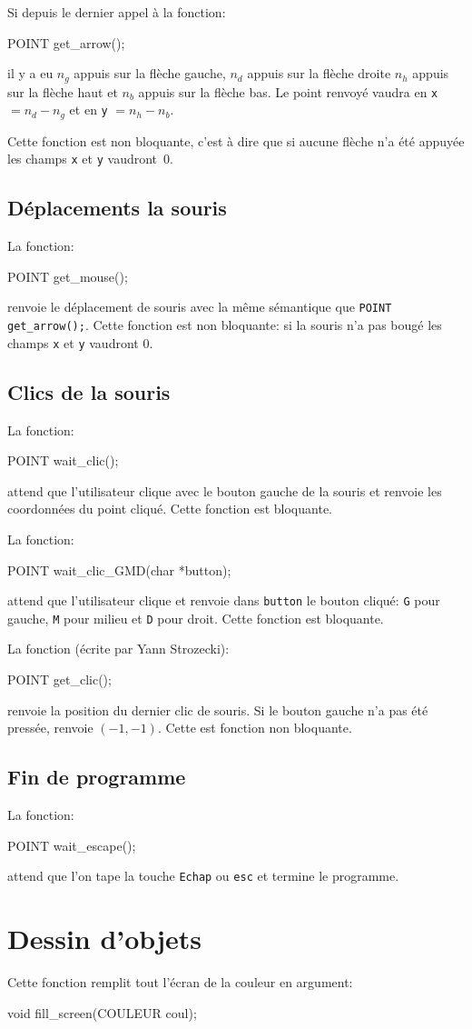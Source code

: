 \documentclass{article}
\newcommand\code[1]{
\begin{mdframed}[linecolor=purple,backgroundcolor=blue!10]
{\tt
#1
}
\end{mdframed}
}
\begin{document}
Si depuis le dernier appel à la fonction:
\code{
POINT get\_arrow();
}
il y a eu $n_g$ appuis sur la flèche gauche, $n_d$ appuis sur la flèche droite
$n_h$ appuis sur la flèche haut et $n_b$ appuis sur la flèche bas.
Le point renvoyé vaudra en \texttt{x} $=n_d-n_g$ et en \texttt{y} $=n_h-n_b$.

Cette fonction est non bloquante, c'est à dire que si aucune flèche n'a été
appuyée les champs \texttt{x} et \texttt{y} vaudront~0.

\subsection{Déplacements la souris}
La fonction:
\code{
POINT get\_mouse();
}
renvoie le déplacement de souris avec la même sémantique que 
\texttt{POINT get\_arrow();}. Cette fonction est non bloquante:
si la souris n'a pas bougé les champs \texttt{x} et \texttt{y} vaudront 0.

\subsection{Clics de la souris}
La fonction:
\code{
POINT wait\_clic();
}
attend que l'utilisateur clique avec le bouton gauche de la souris
et renvoie les coordonnées du point cliqué. Cette fonction est bloquante.

La fonction:
\code{
POINT wait\_clic\_GMD(char *button);
}
attend que l'utilisateur clique  et renvoie dans \texttt{button} le bouton cliqué:
\texttt{G} pour gauche, \texttt{M} pour milieu et \texttt{D} pour droit.
Cette fonction est bloquante.

La fonction (écrite par Yann Strozecki):
\code{
POINT get\_clic();
}
renvoie la position du dernier clic de souris.
Si le bouton gauche n'a pas été pressée, renvoie $(-1,-1)$.
Cette est fonction non bloquante.

\subsection{Fin de programme}

La fonction:
\code{
POINT wait\_escape();
}
attend que l'on tape la touche \texttt{Echap} ou \texttt{esc} et termine le programme.

\section{Dessin d'objets}
Cette fonction remplit tout l'écran de la couleur en argument:
\code{
void fill\_screen(COULEUR coul);
}
\end{document}
